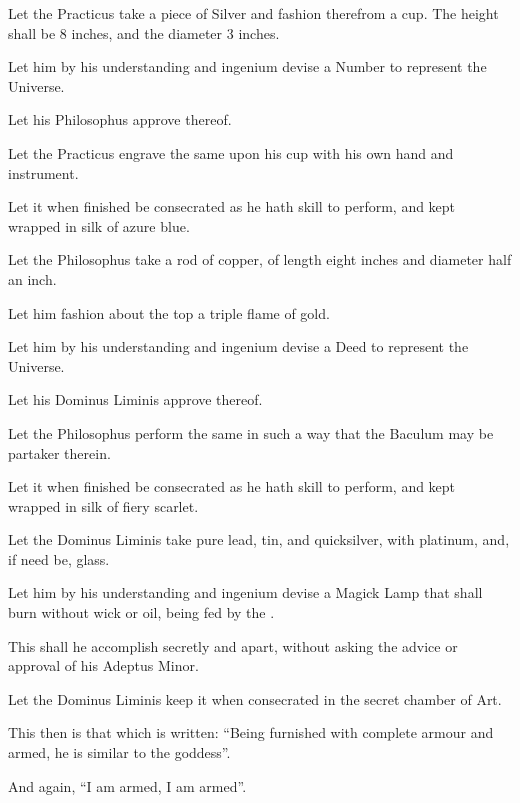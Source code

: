 \begin{description}
\item Let the Practicus take a piece of Silver and fashion therefrom a cup. The height shall be 8 inches, and the diameter 3 inches.
\item Let him by his understanding and ingenium devise a Number to represent the Universe.
\item Let his Philosophus approve thereof.
\item Let the Practicus engrave the same upon his cup with his own hand and instrument.
\item Let it when finished be consecrated as he hath skill to perform, and kept wrapped in silk of azure blue.
\end{description}

\begin{description}
\item Let the Philosophus take a rod of copper, of length eight inches and diameter half an inch.
\item Let him fashion about the top a triple flame of gold.
\item Let him by his understanding and ingenium devise a Deed to represent the Universe.
\item Let his Dominus Liminis approve thereof.
\item Let the Philosophus perform the same in such a way that the Baculum may be partaker therein.
\item Let it when finished be consecrated as he hath skill to perform, and kept wrapped in silk of fiery scarlet.
\end{description}

\begin{description}
\item Let the Dominus Liminis take pure lead, tin, and quicksilver, with platinum, and, if need be, glass.
\item Let him by his understanding and ingenium devise a Magick Lamp that shall burn without wick or oil, being fed by the \AEthyr.
\item This shall he accomplish secretly and apart, without asking the advice or approval of his Adeptus Minor.
\item Let the Dominus Liminis keep it when consecrated in the secret chamber of Art.
\item This then is that which is written: \enquote{Being furnished with complete armour and armed, he is similar to the goddess}.
\item And again, \enquote{I am armed, I am armed}.
\end{description}
